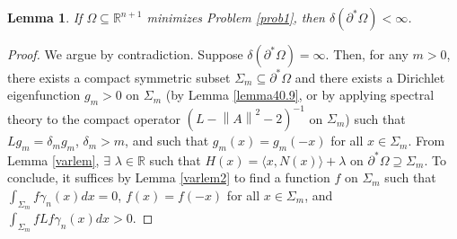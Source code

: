 \documentclass[12pt,reqno]{amsart}
\newtheorem{lemma}[theorem]{Lemma}
\theoremstyle{definition}
\renewcommand{\subset}{\subseteq}
\renewcommand{\supset}{\supseteq}
\newcommand{\vnormt}[1]{\left\|#1\right\|}    %
\newcommand{\R}{\mathbb{R}}
\newcommand{\redA}{\partial^{*}\Omega}
\newcommand{\sdimn}{n}
\newcommand{\adimn}{n+1}
\newcommand{\scon}{\lambda}
\newcommand{\pcon}{\delta}
\begin{document}
\begin{lemma}\label{lemma95.1}
If $\Omega\subset\R^{\adimn}$ minimizes Problem \ref{prob1}, then $\pcon(\redA)<\infty$.
\end{lemma}
\begin{proof}
We argue by contradiction.  Suppose $\pcon(\redA)=\infty$.  Then, for any $m>0$, there exists a compact symmetric subset $\Sigma_{m}\subset\redA$ and there exists a Dirichlet eigenfunction $g_{m}>0$ on $\Sigma_{m}$ (by Lemma \ref{lemma40.9}, or by applying spectral theory to the compact operator $(L-\vnormt{A}^{2}-2)^{-1}$ on $\Sigma_{m}$) such that $Lg_{m}=\pcon_{m}g_{m}$, $\pcon_{m}>m$, and such that $g_{m}(x)=g_{m}(-x)$ for all $x\in\Sigma_{m}$.  From Lemma \ref{varlem}, $\exists$ $\scon\in\R$ such that $H(x)=\langle x,N(x)\rangle+\scon$ on $\redA\supset\Sigma_{m}$.  To conclude, it suffices by Lemma \ref{varlem2} to find a function $f$ on $\Sigma_{m}$ such that $\int_{\Sigma_{m}}f\gamma_{\sdimn}(x)dx=0$, $f(x)=f(-x)$ for all $x\in\Sigma_{m}$, and $\int_{\Sigma_{m}}fLf\gamma_{\sdimn}(x)dx>0$.


\end{proof}
\end{document}
